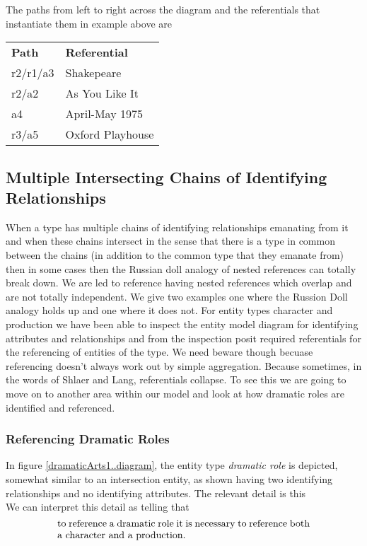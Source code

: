 \begin{equation*}

\end{equation*}

The paths from left to right across the diagram and the referentials that instantiate them in example above are\\
\newline
\begin{tabular}{l l}
\textbf{Path}     & \textbf{Referential} \\
r2/r1/a3 & Shakepeare       \\
r2/a2    & As You Like It   \\
a4       & April-May 1975   \\
r3/a5    & Oxford Playhouse
\end{tabular}


\subsection{Multiple Intersecting Chains of Identifying Relationships}
When a type has multiple chains of identifying relationships emanating from it and when these chains intersect in the sense that there is a type in common between the chains (in addition to the
common type that they emanate from) then in some cases then the Russian doll analogy of nested references can totally break down. We are led to reference having nested references which overlap and are not totally independent. We give two examples one where the Russion Doll analogy holds up and one where it does not. 
For entity types character and production we have been able to inspect the entity model diagram for identifying  attributes and relationships and from the inspection posit required referentials  for the referencing of entities of the type.
We need beware though becuase referencing doesn't always work out by simple aggregation. Because sometimes,
in the words of Shlaer and Lang, referentials collapse. 
To see this we are going to move on to another area within our model and look at how dramatic roles are identified and referenced.

 \subsubsection{Referencing Dramatic Roles}
\mynote
In figure \ref{dramaticArts1..diagram}, the entity type \textit{dramatic role} is
depicted, somewhat similar to an intersection entity, as shown having
two identifying relationships and no identifying attributes.
The relevant detail is  this
\begin{equation*}

\end{equation*}
We can interpret this detail as telling that
\begin{equation}
\label{DramaticRoleReferencing}
\text{\parbox{9cm}{to reference a dramatic role it is necessary  
to reference both a character and  a production.}}
\end{equation}

